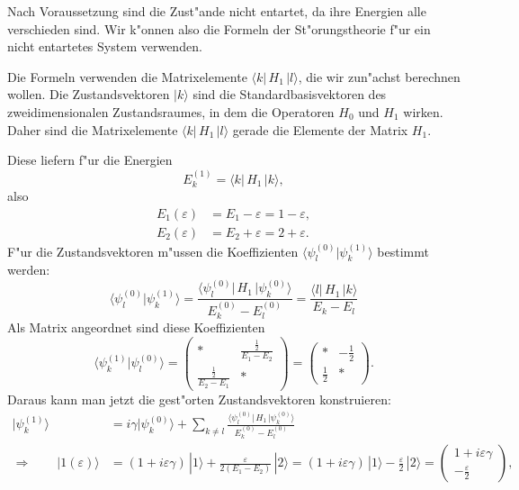 \begin{loesung}
\begin{teilaufgaben}
\item
Nach Voraussetzung sind die Zust"ande nicht entartet, da ihre Energien
alle verschieden sind.
Wir k"onnen also die Formeln der St"orungstheorie f"ur ein nicht
entartetes System verwenden.

Die Formeln verwenden die
Matrixelemente $\langle k|\,H_1\,|l\rangle$,
die wir zun"achst berechnen wollen.
Die Zustandsvektoren $|k\rangle$ sind die Standardbasisvektoren
des zweidimensionalen Zustandsraumes, in dem die Operatoren $H_0$
und $H_1$ wirken.
Daher sind die Matrixelemente $\langle k|\,H_1\,|l\rangle$ gerade
die Elemente der Matrix $H_1$.

Diese liefern f"ur die
Energien
\[
E_k^{(1)}=\langle k|\, H_1\,|k\rangle,
\]
also 
\begin{align*}
E_1(\varepsilon)&=E_1-\varepsilon=1-\varepsilon,\\
E_2(\varepsilon)&=E_2+\varepsilon=2+\varepsilon.
\end{align*}
F"ur die Zustandsvektoren m"ussen die Koeffizienten 
$\langle\psi_l^{(0)}|\psi_k^{(1)}\rangle$ bestimmt werden:
\[
\langle\psi_l^{(0)}|\psi_k^{(1)}\rangle
=
\frac{\langle\psi_l^{(0)}|\,H_1\,|\psi_k^{(0)}\rangle}{E_k^{(0)}-E_l^{(0)}}
=
\frac{\langle l|\,H_1\,|k\rangle}{E_k-E_l}
\]
Als Matrix angeordnet sind diese Koeffizienten
\[
\langle\psi_k^{(1)}|\psi_l^{(0)}\rangle
=
\begin{pmatrix}
*
	&\displaystyle\frac{\frac12}{E_1-E_2}\\
\displaystyle\frac{\frac12}{E_2-E_1}
	&*
\end{pmatrix}
=
\begin{pmatrix}
*
	&\displaystyle-\frac12\\
\displaystyle\frac12
	&*
\end{pmatrix}.
\]
Daraus kann man jetzt die gest"orten Zustandsvektoren konstruieren:
\begin{align*}
|\psi_k^{(1)}\rangle
&=
i\gamma|\psi_k^{(0)}\rangle
+\sum_{k\ne l}\frac{\langle\psi_l^{(0)}|\,H_1\,|\psi_k^{(0)}\rangle}{E_k^{(0)}-E_l^{(0)}}
\\
\Rightarrow\qquad
|1(\varepsilon)\rangle
&=
(1+i\varepsilon\gamma)\,|1\rangle
	+ \frac{\varepsilon}{2(E_1-E_2)}\,|2\rangle 
=
(1+i\varepsilon\gamma)\,|1\rangle
	- \frac{\varepsilon}{2}\,|2\rangle 
=
\begin{pmatrix}
1+i\varepsilon\gamma \\ \displaystyle-\frac{\varepsilon}2
\end{pmatrix},

\end{align*}
\end{teilaufgaben}
\end{loesung}
